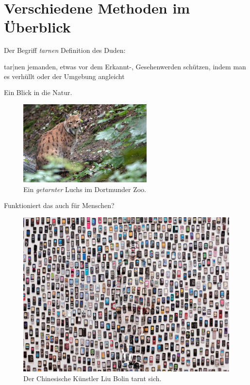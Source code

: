 \section{Verschiedene Methoden im \"Uberblick}

\begin{frame}{Der Begriff \textit{tarnen}}
  Definition des Duden:
  \begin{block}{tar|nen}
    jemanden, etwas vor dem Erkannt-, Gesehenwerden sch\"utzen,
    indem man es verh\"ullt oder der Umgebung angleicht
  \end{block}
\end{frame}

\begin{frame}{Ein Blick in die Natur.}
  \begin{figure}
    \centering
    \caption{Ein \textit{getarnter} Luchs im Dortmunder Zoo.}
    \includegraphics[width=0.6\textwidth]{images/luchs.jpeg}
  \end{figure}
\end{frame}

\begin{frame}{Funktioniert das auch f\"ur Menschen?}
  \begin{figure}
    \centering
    \caption{Der Chinesische K\"unstler Liu Bolin tarnt sich. \cite{humanhide}}
    \includegraphics[height=0.8\textheight]{images/liubolin.jpg}
  \end{figure}
\end{frame}

